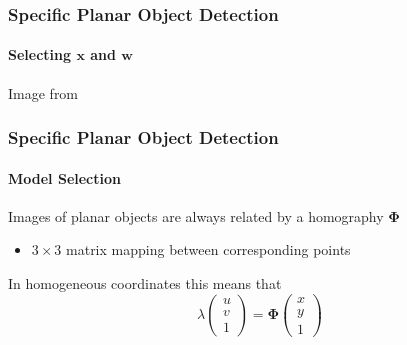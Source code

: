 \documentclass[xetex,professionalfont]{beamer}
\renewcommand{\vec}[1]{\ensuremath{\mathbf{#1}}}
\newcommand{\vw}{\vec{w}}
\newcommand{\vx}{\vec{x}}
\renewcommand\emph[1]{\textcolor{tuwcvl_inf_red}{#1}}
\begin{document}
\begin{frame}
\frametitle{Specific Planar Object Detection}
\framesubtitle{Selecting $\vx$ and $\vw$}

\begin{center}
    {\centering Image from \cite{prince12}}
\end{center}

\end{frame}


\begin{frame}
\frametitle{Specific Planar Object Detection}
\framesubtitle{Model Selection}

Images of planar objects are always related by a \emph{homography} $\boldsymbol{\Phi}$
\begin{itemize}
	\item $3\times3$ matrix mapping between corresponding points
\end{itemize}

\bigskip
In homogeneous coordinates this means that
\[
	\lambda
	\begin{pmatrix}
		u \\ v \\ 1
	\end{pmatrix}
	= \boldsymbol{\Phi}
	\begin{pmatrix}
		x \\ y \\ 1
	\end{pmatrix}
\]

\end{frame}

\end{document}
